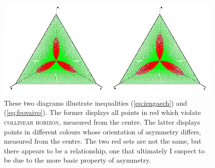 \documentclass[12pt]{article}
\begin{document}
\begin{figure}[ht]
  \begin{flushright}
    \begin{minipage}[h]{\linewidth}
     \includegraphics[width=\textwidth]{fleur-concat-edited.png}
      \caption{\footnotesize These two diagrams illustrate
        inequalities (\ref{eq:iengaech}) and (\ref{eq:feovaivo}). The
        former displays all points in red which violate
        \textsc{collinear horizon}, measured from the centre. The
        latter displays points in different colours whose orientation
        of asymmetry differs, measured from the centre. The two red
        sets are not the same, but there appears to be a relationship,
        one that ultimately I suspect to be due to the more basic
        property of asymmetry.}
      \label{fig:eeghoomo}
    \end{minipage}
  \end{flushright}
\end{figure}
\end{document}
